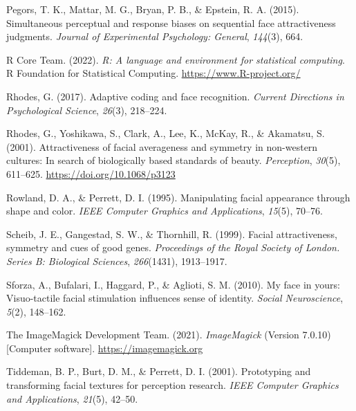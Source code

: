 \documentclass[
  doc,floatsintext]{apa6}
\newlength{\cslhangindent}
\newlength{\cslentryspacingunit} %
\newenvironment{CSLReferences}[2] %
 {%
  \setlength{\parindent}{0pt}
  \ifodd #1
  \let\oldpar\par
  \def\par{\hangindent=\cslhangindent\oldpar}
  \fi
  \setlength{\parskip}{#2\cslentryspacingunit}
 }%
 {}
\begin{document}
\begin{CSLReferences}{1}{0}
\leavevmode{}%
Pegors, T. K., Mattar, M. G., Bryan, P. B., \& Epstein, R. A. (2015). Simultaneous perceptual and response biases on sequential face attractiveness judgments. \emph{Journal of Experimental Psychology: General}, \emph{144}(3), 664.

\leavevmode{}%
R Core Team. (2022). \emph{R: A language and environment for statistical computing}. R Foundation for Statistical Computing. \url{https://www.R-project.org/}

\leavevmode{}%
Rhodes, G. (2017). Adaptive coding and face recognition. \emph{Current Directions in Psychological Science}, \emph{26}(3), 218--224.

\leavevmode{}%
Rhodes, G., Yoshikawa, S., Clark, A., Lee, K., McKay, R., \& Akamatsu, S. (2001). Attractiveness of facial averageness and symmetry in non-western cultures: In search of biologically based standards of beauty. \emph{Perception}, \emph{30}(5), 611--625. \url{https://doi.org/10.1068/p3123}

\leavevmode{}%
Rowland, D. A., \& Perrett, D. I. (1995). Manipulating facial appearance through shape and color. \emph{IEEE Computer Graphics and Applications}, \emph{15}(5), 70--76.

\leavevmode{}%
Scheib, J. E., Gangestad, S. W., \& Thornhill, R. (1999). Facial attractiveness, symmetry and cues of good genes. \emph{Proceedings of the Royal Society of London. Series B: Biological Sciences}, \emph{266}(1431), 1913--1917.

\leavevmode{}%
Sforza, A., Bufalari, I., Haggard, P., \& Aglioti, S. M. (2010). My face in yours: Visuo-tactile facial stimulation influences sense of identity. \emph{Social Neuroscience}, \emph{5}(2), 148--162.

\leavevmode{}%
The ImageMagick Development Team. (2021). \emph{ImageMagick} (Version 7.0.10) {[}Computer software{]}. \url{https://imagemagick.org}

\leavevmode{}%
Tiddeman, B. P., Burt, D. M., \& Perrett, D. I. (2001). Prototyping and transforming facial textures for perception research. \emph{IEEE Computer Graphics and Applications}, \emph{21}(5), 42--50.


\end{CSLReferences}
\end{document}
